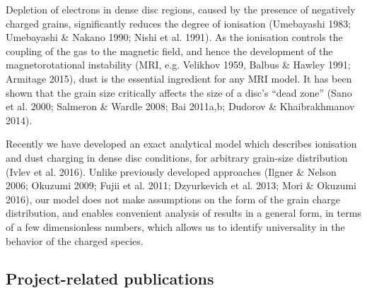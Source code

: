 \documentclass[10pt,fleqn,twoside]{article}
\newcommand{\Tcol}{\color{blue}}
\begin{document}
Depletion of electrons in dense disc regions, caused by the presence of negatively charged grains, significantly reduces the
degree of ionisation (Umebayashi 1983; Umebayashi \& Nakano 1990; Nishi et al. 1991). As the ionisation controls the coupling of the gas to the magnetic field, and hence the development of the magnetorotational instability (MRI, e.g. Velikhov 1959, Balbus \& Hawley 1991; Armitage 2015), dust is the essential ingredient for any MRI model. It has been shown that the grain size critically affects the size of a disc's ``dead zone'' (Sano et al. 2000; Salmeron \& Wardle 2008; Bai 2011a,b; Dudorov \& Khaibrakhmanov 2014).

Recently we have developed an exact analytical model which describes ionisation and dust charging in dense disc conditions,
for arbitrary grain-size distribution (Ivlev et al. 2016). Unlike previously developed approaches (Ilgner \& Nelson 2006; Okuzumi 2009; Fujii et al. 2011; Dzyurkevich et al. 2013; Mori \& Okuzumi 2016), our model does not make assumptions on the form of the grain charge distribution, and enables convenient analysis of results in a general form, in terms of a few dimensionless numbers, which allows us to identify universality in the behavior of the charged species.

\subsection{\Tcol Project-related publications}
\end{document}
